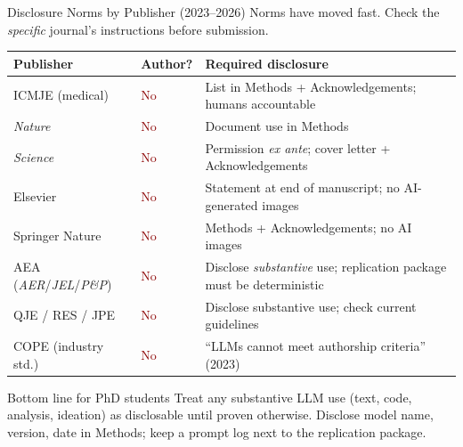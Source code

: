 \documentclass[aspectratio=169,10pt]{beamer}
\newcommand{\emphc}[1]{\textcolor{harvardcrimson}{#1}}
\begin{document}
\begin{frame}{Disclosure Norms by Publisher (2023--2026)}
\scriptsize
Norms have moved fast. Check the \emph{specific} journal's instructions before submission.

\vspace{0.2em}
\renewcommand{\arraystretch}{1.05}
\begin{tabular}{p{2.5cm} p{1.4cm} p{7.5cm}}
\toprule
\textbf{Publisher} & \textbf{Author?} & \textbf{Required disclosure} \\
\midrule
ICMJE (medical) & \textcolor{darkred}{No} & List in Methods + Acknowledgements; humans accountable \\
\textit{Nature} & \textcolor{darkred}{No} & Document use in Methods \\
\textit{Science} & \textcolor{darkred}{No} & Permission \emph{ex ante}; cover letter + Acknowledgements \\
Elsevier & \textcolor{darkred}{No} & Statement at end of manuscript; no AI-generated images \\
Springer Nature & \textcolor{darkred}{No} & Methods + Acknowledgements; no AI images \\
AEA (\textit{AER}/\textit{JEL}/\textit{P\&P}) & \textcolor{darkred}{No} & Disclose \emph{substantive} use; replication package must be deterministic \\
QJE / RES / JPE & \textcolor{darkred}{No} & Disclose substantive use; check current guidelines \\
COPE (industry std.) & \textcolor{darkred}{No} & ``LLMs cannot meet authorship criteria'' (2023) \\
\bottomrule
\end{tabular}

\vspace{0.3em}
\begin{alertblock}{Bottom line for PhD students}
\tiny
Treat \emphc{any} substantive LLM use (text, code, analysis, ideation) as disclosable until proven otherwise. Disclose model name, version, date in Methods; keep a prompt log next to the replication package.
\end{alertblock}
\end{frame}
\end{document}
